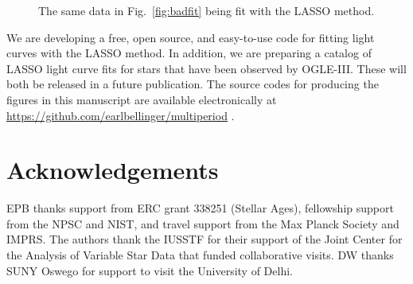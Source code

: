 \documentclass[11pt,twoside]{book}
\begin{document}
\begin{figure}[!t]
    \centering
    
    \caption{The same data in Fig.~\ref{fig:badfit} being fit with the LASSO method.}%
    \label{fig:goodfit} 
\end{figure}

We are developing a free, open source, and easy-to-use code for fitting light curves with the LASSO method. In addition, we are preparing a catalog of LASSO light curve fits for stars that have been observed by OGLE-III. These will both be released in a future publication. The source codes for producing the figures in this manuscript are available electronically at \url{https://github.com/earlbellinger/multiperiod} \citep{bellinger2015lasso}.

\section*{Acknowledgements}
EPB thanks support from ERC grant 338251 (Stellar Ages), fellowship support from the NPSC and NIST, and travel support from the Max Planck Society and IMPRS. The authors thank the IUSSTF for their support of the Joint Center for the Analysis of Variable Star Data that funded collaborative visits. DW thanks SUNY Oswego for support to visit the University of Delhi. 
\end{document}
